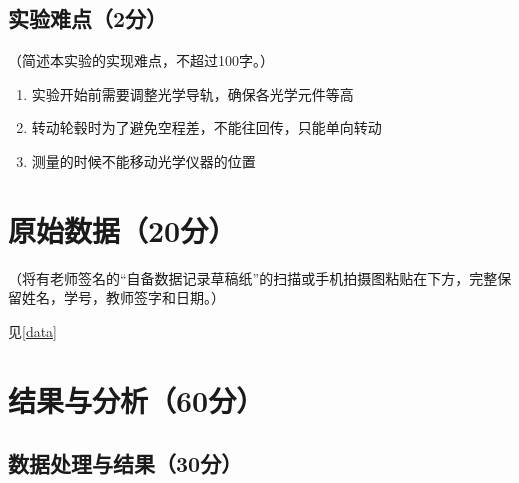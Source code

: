 \documentclass[]{../../templates/Report}%
\begin{document}
\subsection{实验难点（2分）}
（简述本实验的实现难点，不超过100字。）
\begin{enumerate}
    \item 实验开始前需要调整光学导轨，确保各光学元件等高
    \item 转动轮毂时为了避免空程差，不能往回传，只能单向转动
    \item 测量的时候不能移动光学仪器的位置
\end{enumerate}
\begin{fullreportonly}
\section{原始数据（20分）}
（将有老师签名的“自备数据记录草稿纸”的扫描或手机拍摄图粘贴在下方，完整保留姓名，学号，教师签字和日期。）

见\cref{data}
\section{结果与分析（60分）}
\subsection{数据处理与结果（30分）}

\end{fullreportonly}
\end{document}
